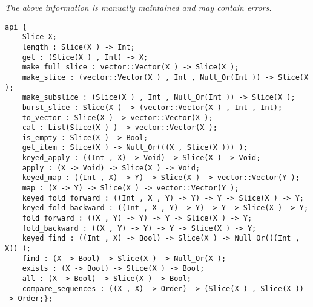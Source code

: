 \label{api:Vector\_Slice}

{\tiny \it The above information is manually maintained and may contain errors.}
\begin{verbatim}
api {
    Slice X;
    length : Slice(X ) -> Int;
    get : (Slice(X ) , Int) -> X;
    make_full_slice : vector::Vector(X ) -> Slice(X );
    make_slice : (vector::Vector(X ) , Int , Null_Or(Int )) -> Slice(X );
    make_subslice : (Slice(X ) , Int , Null_Or(Int )) -> Slice(X );
    burst_slice : Slice(X ) -> (vector::Vector(X ) , Int , Int);
    to_vector : Slice(X ) -> vector::Vector(X );
    cat : List(Slice(X ) ) -> vector::Vector(X );
    is_empty : Slice(X ) -> Bool;
    get_item : Slice(X ) -> Null_Or(((X , Slice(X ))) );
    keyed_apply : ((Int , X) -> Void) -> Slice(X ) -> Void;
    apply : (X -> Void) -> Slice(X ) -> Void;
    keyed_map : ((Int , X) -> Y) -> Slice(X ) -> vector::Vector(Y );
    map : (X -> Y) -> Slice(X ) -> vector::Vector(Y );
    keyed_fold_forward : ((Int , X , Y) -> Y) -> Y -> Slice(X ) -> Y;
    keyed_fold_backward : ((Int , X , Y) -> Y) -> Y -> Slice(X ) -> Y;
    fold_forward : ((X , Y) -> Y) -> Y -> Slice(X ) -> Y;
    fold_backward : ((X , Y) -> Y) -> Y -> Slice(X ) -> Y;
    keyed_find : ((Int , X) -> Bool) -> Slice(X ) -> Null_Or(((Int , X)) );
    find : (X -> Bool) -> Slice(X ) -> Null_Or(X );
    exists : (X -> Bool) -> Slice(X ) -> Bool;
    all : (X -> Bool) -> Slice(X ) -> Bool;
    compare_sequences : ((X , X) -> Order) -> (Slice(X ) , Slice(X )) -> Order;};
\end{verbatim}
